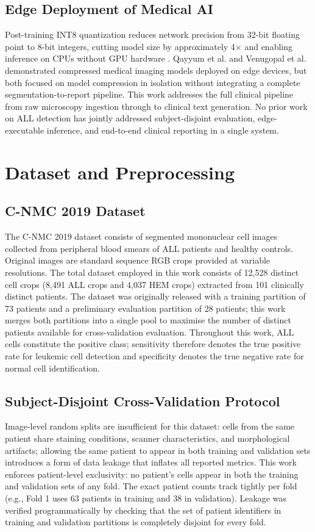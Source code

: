 \documentclass[journal,twoside,web]{ieeecolor}
\begin{document}
\subsection{Edge Deployment of Medical AI}
Post-training INT8 quantization reduces network precision from 32-bit floating point to 8-bit integers, cutting model size by approximately 4$\times$ and enabling inference on CPUs without GPU hardware \cite{b_quant_survey, b_jacob2018}. Qayyum et al. \cite{b_qayyum2020} and Venugopal et al. \cite{b_venugopal2022} demonstrated compressed medical imaging models deployed on edge devices, but both focused on model compression in isolation without integrating a complete segmentation-to-report pipeline. This work addresses the full clinical pipeline from raw microscopy ingestion through to clinical text generation. No prior work on ALL detection has jointly addressed subject-disjoint evaluation, edge-executable inference, and end-to-end clinical reporting in a single system.

\section{Dataset and Preprocessing}
\label{sec:data}

\subsection{C-NMC 2019 Dataset}
The C-NMC 2019 dataset \cite{b5} consists of segmented mononuclear cell images collected from peripheral blood smears of ALL patients and healthy controls. Original images are standard sequence RGB crops provided at variable resolutions. The total dataset employed in this work consists of 12,528 distinct cell crops (8,491 ALL crops and 4,037 HEM crops) extracted from 101 clinically distinct patients. The dataset was originally released with a training partition of 73 patients and a preliminary evaluation partition of 28 patients; this work merges both partitions into a single pool to maximise the number of distinct patients available for cross-validation evaluation. Throughout this work, ALL cells constitute the positive class; sensitivity therefore denotes the true positive rate for leukemic cell detection and specificity denotes the true negative rate for normal cell identification.

\subsection{Subject-Disjoint Cross-Validation Protocol}
Image-level random splits are insufficient for this dataset: cells from the same patient share staining conditions, scanner characteristics, and morphological artifacts; allowing the same patient to appear in both training and validation sets introduces a form of data leakage that inflates all reported metrics. This work enforces patient-level exclusivity: no patient's cells appear in both the training and validation sets of any fold. The exact patient counts track tightly per fold (e.g., Fold 1 uses 63 patients in training and 38 in validation). Leakage was verified programmatically by checking that the set of patient identifiers in training and validation partitions is completely disjoint for every fold.
\end{document}
